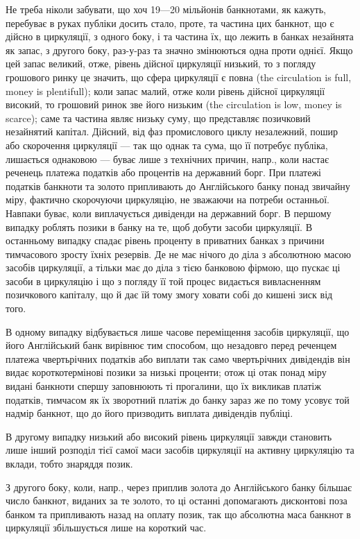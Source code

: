 
Не треба ніколи забувати, що хоч 19—20 мільйонів банкнотами, як
кажуть, перебуває в руках публіки досить стало, проте, та частина цих банкнот,
що є дійсно в циркуляції, з одного боку, і та частина їх, що лежить в банках
незайнята як запас, з другого боку, раз-у-раз та значно змінюються одна
проти однієї. Якщо цей запас великий, отже, рівень дійсної циркуляції низький,
то з погляду грошового ринку це значить, що сфера циркуляції є повна (the
circulation is full, money is plentifull); коли запас малий, отже коли рівень
дійсної циркуляції високий, то грошовий ринок зве його низьким (the circulation
is low, money is scarce); саме та частина являє низьку суму, що представляє
позичковий незайнятий капітал. Дійсний, від фаз промислового циклу незалежний,
пошир або скорочення циркуляції — так що однак та сума, що її потребує
публіка, лишається однаковою — буває лише з технічних причин, напр., коли настає
реченець платежа податків або процентів на державний борг. При платежі податків
банкноти та золото припливають до Англійського банку понад звичайну міру,
фактично скорочуючи циркуляцію, не зважаючи на потреби останньої. Навпаки
буває, коли виплачується дивіденди на державний борг. В першому випадку
роблять позики в банку на те, щоб добути засоби циркуляції. В останньому
випадку спадає рівень проценту в приватних банках з причини тимчасового
зросту їхніх резервів. Де не має нічого до діла з абсолютною масою засобів
циркуляції, а тільки має до діла з тією банковою фірмою, що пускає ці засоби
в циркуляцію і що з погляду її той процес видається вивласненням
позичкового капіталу, що й дає їй тому змогу ховати собі до кишені зиск
від того.

В одному випадку відбувається лише часове переміщення засобів циркуляції,
що його Англійський банк вирівнює тим способом, що незадовго перед реченцем
платежа чвертьрічних податків або виплати так само чвертьрічних дивідендів
він видає короткотермінові позики за низькі проценти; отож ці отак понад міру
видані банкноти спершу заповнюють ті прогалини, що їх викликав платіж
податків, тимчасом як їх зворотний платіж до банку зараз же по тому усовує
той надмір банкнот, що до його призводить виплата дивідендів публіці.

В другому випадку низький або високий рівень циркуляції завжди становить
лише інший розподіл тієї самої маси засобів циркуляції на активну циркуляцію
та вклади, тобто знаряддя позик.

З другого боку, коли, напр., через приплив золота до Англійського банку
більшає число банкнот, виданих за те золото, то ці останні допомагають
дисконтові поза банком та припливають назад на оплату позик, так що абсолютна
маса банкнот в циркуляції збільшується лише на короткий час.

